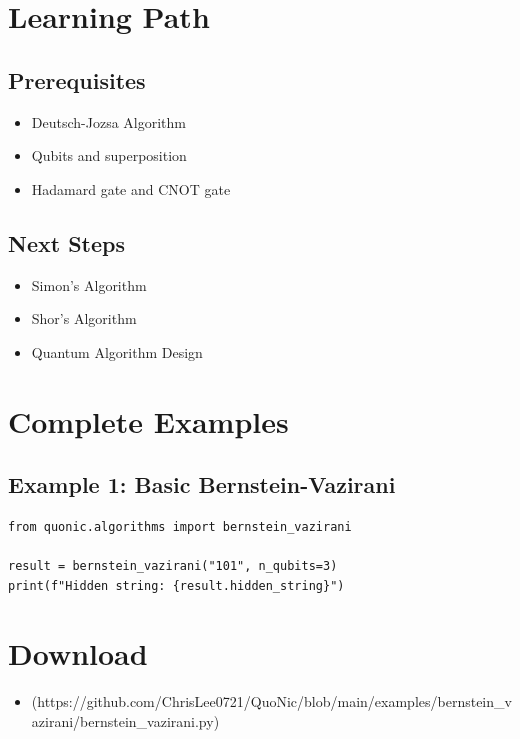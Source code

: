 \documentclass[12pt,a4paper]{article}
\begin{document}
\section{Learning Path}

\subsection{Prerequisites}
\begin{itemize}
  \item Deutsch-Jozsa Algorithm
  \item Qubits and superposition
  \item Hadamard gate and CNOT gate
\end{itemize}

\subsection{Next Steps}
\begin{itemize}
  \item Simon's Algorithm
  \item Shor's Algorithm
  \item Quantum Algorithm Design
\end{itemize}

\section{Complete Examples}

\subsection{Example 1: Basic Bernstein-Vazirani}

\begin{verbatim}
from quonic.algorithms import bernstein_vazirani

result = bernstein_vazirani("101", n_qubits=3)
print(f"Hidden string: {result.hidden_string}")
\end{verbatim}

\section{Download}

\begin{itemize}
  \item [bernstein\_vazirani.py](https://github.com/ChrisLee0721/QuoNic/blob/main/examples/bernstein_vazirani/bernstein_vazirani.py)
\end{itemize}
\end{document}
